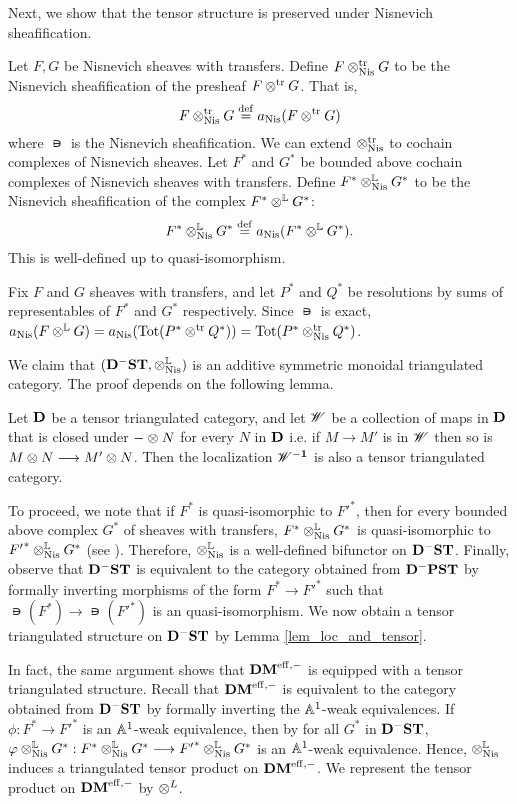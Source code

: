 Next, we show that the tensor structure is preserved under
Nisnevich sheafification.

\begin{defn}\label{def_shcor_tensor}
Let $F, G$ be Nisnevich sheaves with transfers. Define
$F \ttrNis G$ to be the Nisnevich sheafification of the presheaf
$F \ttr G$. That is,
\[
F \ttrNis G \defeq \nis(F \ttr G)
\]
where $\nis$ is the Nisnevich sheafification. We can extend 
$\ttrNis$ to cochain complexes of Nisnevich sheaves. Let $F^*$ and 
$G^*$ be bounded above cochain complexes of Nisnevich sheaves with transfers. 
Define $F^* \tLNis G^*$ to be the Nisnevich sheafification of the 
complex $F^* \tL G^*$:
\[
F^* \tLNis G^* \defeq \nis(F^* \tL G^*).
\]
This is well-defined up to quasi-isomorphism.
\end{defn}

\begin{rmk}
Fix $F$ and $G$ sheaves with transfers, and let $P^*$ and $Q^*$ be
resolutions by sums of representables of $F^*$ and $G^*$
respectively. Since $\nis$ is exact, $\nis(F \tL G) =
\nis(\Tot(P^* \ttr Q^*)) = \Tot(P^* \ttrNis Q^*)$.
\end{rmk}

We claim that $(\DShCor, \tLNis)$ is an additive symmetric 
monoidal triangulated category. The proof depends on the following
lemma.

\begin{lem}\label{lem_loc_and_tensor}
Let $\DCat$ be a tensor triangulated category, and let $\Cat{W}$
be a collection of maps in $\DCat$ that is closed under $-\tensor 
N$ for every $N$ in $\DCat$ i.e. if $M \to M'$ is in $\Cat{W}$ then 
so is $M \tensor N \to M' \tensor N$. Then the localization $\DCat 
[\Cat{W}^{-1}]$ is also a tensor triangulated category.
\end{lem}

To proceed, we note that if $F^*$ is quasi-isomorphic to ${F'}^*$,
then for every bounded above complex $G^*$ of sheaves with 
transfers, $F^* \tLNis G^*$ is quasi-isomorphic to 
${F'}^* \tLNis G^*$ (see \cite[8.16]{MVW}). Therefore, $\tLNis$ is 
a well-defined bifunctor on $\DShCor$. Finally, observe that 
$\DShCor$ is equivalent to the category obtained from $\DCat^-\PST$ by formally inverting 
morphisms of the form $F^* \to {F'}^*$ such that $\nis(F^*) \to 
\nis({F'}^*)$ is an quasi-isomorphism. We now obtain a tensor triangulated 
structure on $\DShCor$ by Lemma \ref{lem_loc_and_tensor}.

In fact, the same argument shows that $\DMeff$ is equipped with a
tensor triangulated structure. Recall that $\DMeff$ is equivalent to
the category obtained from $\DShCor$ by formally inverting the
$\A^1$-weak equivalences. If $\phi : F^* \to
{F'}^*$ is an $\A^1$-weak equivalence, then by \cite[9.5]{MVW} for all $G^*$ in
$\DShCor$, $\phi \tLNis G^* : F^* \tLNis G^* \to {F'}^* \tLNis G^*$ is
an $\A^1$-weak equivalence. Hence, $\tLNis$ induces a triangulated tensor 
product on $\DMeff$. We represent the tensor product on $\DMeff$ by $\tDM$.

